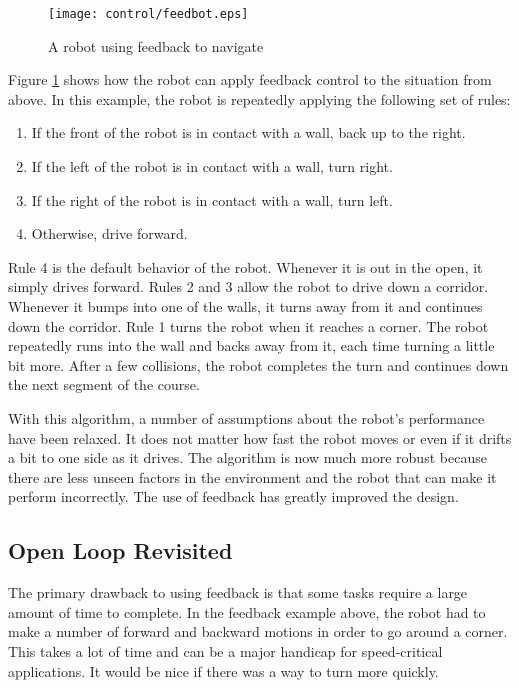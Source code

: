 \begin{figure}[htbp]
\begin{center}
\texttt{[image: control/feedbot.eps]}
 \caption{A robot using feedback to navigate}
 \label{feedbot}
\end{center}
\end{figure}

Figure \ref{feedbot} shows how the robot can apply feedback control to
the situation from above. In this example, the robot is repeatedly
applying the following set of rules:

\begin{enumerate}

\item If the front of the robot is in contact with a wall, back up to the right.
\item If the left of the robot is in contact with a wall, turn right.
\item If the right of the robot is in contact with a wall, turn left.
\item Otherwise, drive forward.

\end{enumerate}

Rule 4 is the default behavior of the robot. Whenever it is out in the
open, it simply drives forward. Rules 2 and 3 allow the robot to drive
down a corridor. Whenever it bumps into one of the walls, it turns
away from it and continues down the corridor. Rule 1 turns the robot
when it reaches a corner. The robot repeatedly runs into the wall and
backs away from it, each time turning a little bit more. After a few
collisions, the robot completes the turn and continues down the next
segment of the course.

With this algorithm, a number of assumptions about the robot's
performance have been relaxed. It does not matter how fast the robot
moves or even if it drifts a bit to one side as it drives. The
algorithm is now much more robust because there are less unseen
factors in the environment and the robot that can make it perform
incorrectly. The use of feedback has greatly improved the design.

\subsection{Open Loop Revisited}

The primary drawback to using feedback is that some tasks require a
large amount of time to complete. In the feedback example above, the
robot had to make a number of forward and backward motions in order to
go around a corner. This takes a lot of time and can be a major
handicap for speed-critical applications. It would be nice if there
was a way to turn more quickly.

